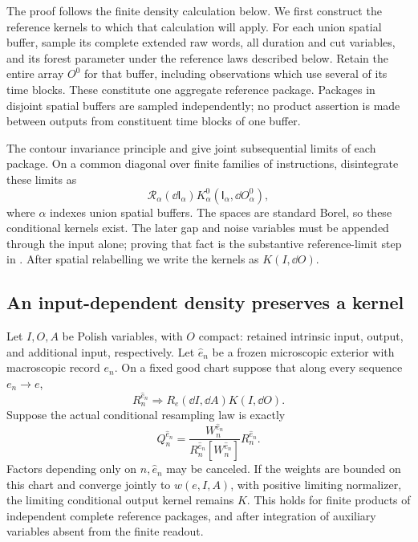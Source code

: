 The proof follows the finite density calculation below. We first
construct the reference kernels to which that calculation will apply.
For each union spatial buffer, sample its complete extended raw words,
all duration and cut variables, and its forest parameter under the
reference laws described below. Retain the entire array \(O^0\) for
that buffer, including observations which use several of its time
blocks. These constitute one aggregate reference package. Packages in
disjoint spatial buffers are sampled independently; no product assertion
is made between outputs from constituent time blocks of one buffer.

The contour invariance principle and  give joint
subsequential limits of each package. On a common diagonal over finite
families of instructions, disintegrate these limits as
\begin{equation}\label{ker:reference-packages}
 \mathcal R_\alpha(\dd\mathsf I_\alpha)
 K^0_\alpha(\mathsf I_\alpha,\dd O^0_\alpha),
\end{equation}
where \(\alpha\) indexes union spatial buffers. The spaces are standard
Borel, so these conditional kernels exist. The later gap and noise
variables must be appended through the input alone; proving that fact
is the substantive reference-limit step in .
After spatial relabelling we write the kernels as \(K(I,\dd O)\).

\subsection{An input-dependent density preserves a kernel}

\begin{lemma}\label{ker:density-ratio}
Let \(I,O,A\) be Polish variables, with \(O\) compact: retained
intrinsic input, output, and additional input, respectively.
Let \(\widehat e_n\) be a frozen microscopic exterior with macroscopic
record \(e_n\).  On a fixed good chart suppose that along every
sequence \(e_n\to e\),
\begin{equation}
 R_n^{\widehat e_n}\Longrightarrow R_e(\dd I,\dd A)K(I,\dd O).
 \label{ker:reference-limit}
\end{equation}
Suppose the actual conditional resampling law is exactly
\begin{equation}
 Q_n^{\widehat e_n}
 =\frac{W_n^{\widehat e_n}}{R_n^{\widehat e_n}[W_n^{\widehat e_n}]}
 R_n^{\widehat e_n}.
 \label{ker:exact-ratio}
\end{equation}
Factors depending only on \(n,\widehat e_n\) may be canceled.
If the weights are bounded on this chart and converge jointly to
\(w(e,I,A)\), with positive limiting normalizer, the limiting
conditional output kernel remains \(K\).
This holds for finite products of independent complete reference
packages, and after integration of auxiliary variables absent from
the finite readout.
\end{lemma}

